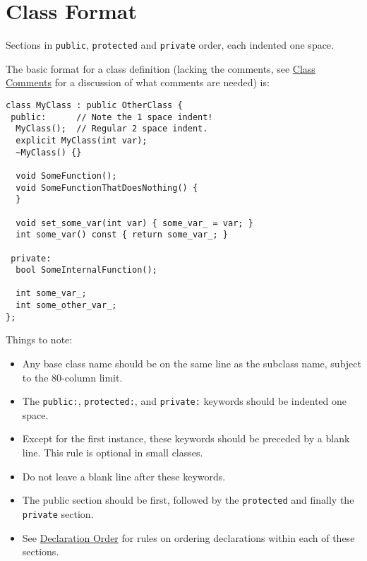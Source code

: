 
\section{Class Format}\label{sec:class-format}
Sections in \texttt{public}, \texttt{protected} and \texttt{private} order, each indented one space.

The basic format for a class definition (lacking the comments, see \hyperref[sec:class-comments]{Class Comments} for a discussion of what comments are needed) is:
\begin{verbatim}
class MyClass : public OtherClass {
 public:      // Note the 1 space indent!
  MyClass();  // Regular 2 space indent.
  explicit MyClass(int var);
  ~MyClass() {}

  void SomeFunction();
  void SomeFunctionThatDoesNothing() {
  }

  void set_some_var(int var) { some_var_ = var; }
  int some_var() const { return some_var_; }

 private:
  bool SomeInternalFunction();

  int some_var_;
  int some_other_var_;
};
\end{verbatim}

Things to note:
\begin{itemize}
    \item Any base class name should be on the same line as the subclass name, subject to the 80-column limit.
    \item The \texttt{public:}, \texttt{protected:}, and \texttt{private:} keywords should be indented one space.
    \item Except for the first instance, these keywords should be preceded by a blank line. This rule is optional in small classes.
    \item Do not leave a blank line after these keywords.
    \item The public section should be first, followed by the \texttt{protected} and finally the \texttt{private} section.
    \item See \hyperref[sec:declaration-order]{Declaration Order} for rules on ordering declarations within each of these sections.
\end{itemize}
